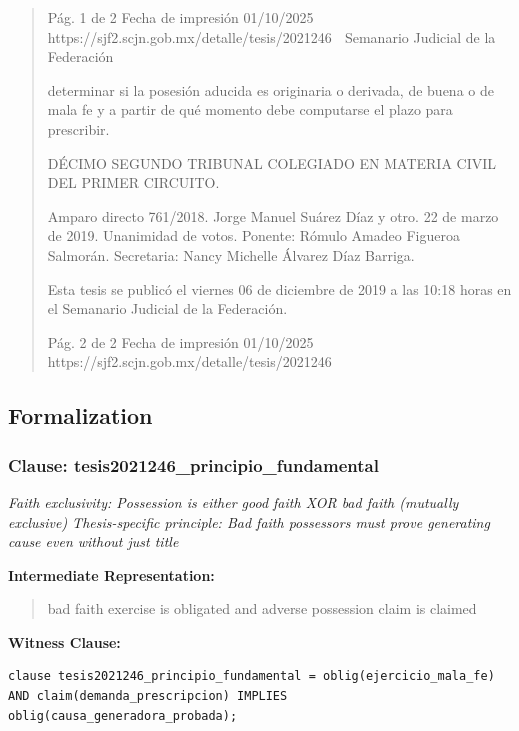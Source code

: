 \documentclass[11pt,a4paper]{article}
\begin{document}
\begin{quote}
                                              Pág. 1 de 2             Fecha de impresión 01/10/2025
  https://sjf2.scjn.gob.mx/detalle/tesis/2021246
                                                  Semanario Judicial de la Federación

determinar si la posesión aducida es originaria o derivada, de buena o de mala fe y a partir de qué
momento debe computarse el plazo para prescribir.

DÉCIMO SEGUNDO TRIBUNAL COLEGIADO EN MATERIA CIVIL DEL PRIMER CIRCUITO.


Amparo directo 761/2018. Jorge Manuel Suárez Díaz y otro. 22 de marzo de 2019. Unanimidad de
votos. Ponente: Rómulo Amadeo Figueroa Salmorán. Secretaria: Nancy Michelle Álvarez Díaz
Barriga.


Esta tesis se publicó el viernes 06 de diciembre de 2019 a las 10:18 horas en el Semanario Judicial
de la Federación.




                                             Pág. 2 de 2           Fecha de impresión 01/10/2025
 https://sjf2.scjn.gob.mx/detalle/tesis/2021246

\end{quote}

\subsection{Formalization}

\subsubsection{Clause: tesis2021246\_principio\_fundamental}

\textit{Faith exclusivity: Possession is either good faith XOR bad faith (mutually exclusive) Thesis-specific principle: Bad faith possessors must prove generating cause even without just title}

\textbf{Intermediate Representation:}

\begin{quote}
bad faith exercise is obligated and adverse possession claim is claimed
\end{quote}

\textbf{Witness Clause:}

\begin{lstlisting}[style=witnessstyle, language=Witness]
clause tesis2021246_principio_fundamental = oblig(ejercicio_mala_fe) AND claim(demanda_prescripcion) IMPLIES oblig(causa_generadora_probada);
\end{lstlisting}
\end{document}
